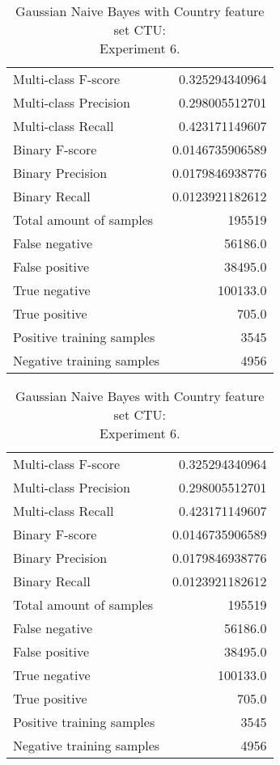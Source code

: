 \begin{table}[H]
\begin{minipage}{0.5\textwidth}
\caption{Gaussian Naive Bayes with Country feature set CTU: \\Experiment 5.}
\centering
\begin{tabular}{l r}
\toprule
Multi-class F-score & 0.325294340964 \\
Multi-class Precision & 0.298005512701 \\
Multi-class Recall & 0.423171149607 \\
\midrule
Binary F-score & 0.0146735906589 \\
Binary Precision & 0.0179846938776 \\
Binary Recall & 0.0123921182612 \\
\midrule
Total amount of samples & 195519 \\
False negative & 56186.0 \\
False positive & 38495.0 \\
True negative & 100133.0 \\
True positive & 705.0 \\
\midrule
Positive training samples & 3545 \\
Negative training samples & 4956 \\
\bottomrule
\end{tabular}
\end{minipage}
\hfillx
\begin{minipage}{0.5\textwidth}
\caption{Gaussian Naive Bayes with Country feature set CTU: \\Experiment 6.}
\centering
\begin{tabular}{l r}
\toprule
Multi-class F-score & 0.325294340964 \\
Multi-class Precision & 0.298005512701 \\
Multi-class Recall & 0.423171149607 \\
\midrule
Binary F-score & 0.0146735906589 \\
Binary Precision & 0.0179846938776 \\
Binary Recall & 0.0123921182612 \\
\midrule
Total amount of samples & 195519 \\
False negative & 56186.0 \\
False positive & 38495.0 \\
True negative & 100133.0 \\
True positive & 705.0 \\
\midrule
Positive training samples & 3545 \\
Negative training samples & 4956 \\
\bottomrule
\end{tabular}
\end{minipage}
\end{table}
